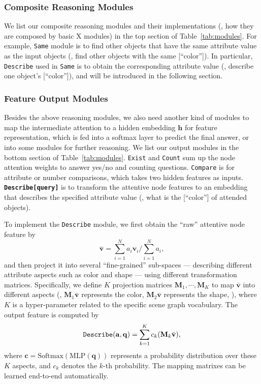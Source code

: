 \documentclass[10pt,twocolumn,letterpaper]{article}
\begin{document}
\vspace{-0.3cm}
\subsubsection{Composite Reasoning Modules}
We list our composite reasoning modules and their implementations (\ie, how they are composed by basic X modules) in the top section of Table~\ref{tab:modules}. For example, \texttt{Same} module is to find other objects that have the same attribute value as the input objects (\eg, find other objects with the same [``color'']).  In particular, \texttt{Describe} used in \texttt{Same} is to obtain the corresponding attribute value (\eg, describe one object's [``color'']), and will be introduced in the following section.


\vspace{-0.3cm}
\subsubsection{Feature Output Modules}
Besides the above reasoning modules, we also need another kind of modules to map the intermediate attention to a hidden embedding $\mathbf{h}$ for feature representation, which is fed into a softmax layer to predict the final answer, or into some modules for further reasoning.
We list our output modules in the bottom section of Table~\ref{tab:modules}.
\texttt{Exist} and \texttt{Count} sum up the node attention weights to answer yes/no and counting questions.
\texttt{Compare} is for attribute or number comparisons, which takes two hidden features as inputs.
\textbf{\texttt{Describe[query]}} is to transform the attentive node features to an embedding that describes the specified attribute value (\eg, what is the [``color''] of attended objects).

To implement the \texttt{Describe} module, we first obtain the ``raw'' attentive node feature by
\vspace{-0.2cm}
\begin{equation}\label{for:barv}
    \bar{\mathbf{v}} = \sum_{i=1}^N a_i \mathbf{v}_i \Big/ \sum_{i=1}^N a_i,
\end{equation}
and then project it into several ``fine-grained'' sub-spaces --- describing different attribute aspects such as color and shape --- using different transformation matrices. 
Specifically, we define $K$ projection matrices $\mathbf{M}_1, \cdots, \mathbf{M}_K$ to map $\bar{\mathbf{v}}$ into different aspects (\eg, $\mathbf{M}_1 \bar{\mathbf{v}}$ represents the color, $\mathbf{M}_2  \bar{\mathbf{v}}$ represents the shape, \etc), where $K$ is a hyper-parameter related to the specific scene graph vocabulary.
The output feature is computed by
\vspace{-0.2cm}
\begin{equation}\label{eq:query}
    \texttt{Describe}(\mathbf{a}, \mathbf{q}) = \sum_{k=1}^{K} c_k (\mathbf{M}_k \bar{\mathbf{v}}),
\vspace{-0.1cm}
\end{equation}
where $\mathbf{c} = \textrm{Softmax}(\textrm{MLP}(\mathbf{q}))$ represents a probability distribution over these $K$ aspects, and $c_k$ denotes the $k$-th probability.
The mapping matrixes can be learned end-to-end automatically.
\end{document}
